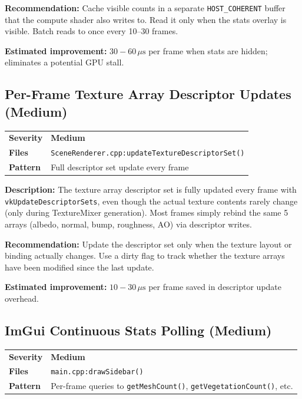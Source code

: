 \documentclass[a4paper,10pt]{article}
\newcommand{\us}{\ensuremath{\,\mu\text{s}}}
\newcommand{\severity}[1]{%
  \ifstrequal{#1}{Critical}{\textcolor{critical}{\textbf{#1}}}{%
  \ifstrequal{#1}{High}{\textcolor{high}{\textbf{#1}}}{%
  \ifstrequal{#1}{Medium}{\textcolor{medium}{\textbf{#1}}}{%
  \ifstrequal{#1}{Low}{\textcolor{low}{\textbf{#1}}}{#1}}}}}
\begin{document}
\noindent\textbf{Recommendation:} Cache visible counts in a separate
\texttt{HOST\_COHERENT} buffer that the compute shader also writes to. Read
it only when the stats overlay is visible. Batch reads to once every 10--30
frames.

\noindent\textbf{Estimated improvement:} $30{-}60\us$ per frame when stats are
hidden; eliminates a potential GPU stall.

\subsection{Per-Frame Texture Array Descriptor Updates (Medium)}

\begin{tabular}{ll}
\textbf{Severity} & \severity{Medium} \\
\textbf{Files}     & \texttt{SceneRenderer.cpp:updateTextureDescriptorSet()} \\
\textbf{Pattern}   & Full descriptor set update every frame \\
\end{tabular}

\vspace{0.5em}
\noindent
\textbf{Description:} The texture array descriptor set is fully updated every
frame with \texttt{vkUpdateDescriptorSets}, even though the actual texture
contents rarely change (only during TextureMixer generation). Most frames
simply rebind the same 5 arrays (albedo, normal, bump, roughness, AO) via
descriptor writes.

\noindent\textbf{Recommendation:} Update the descriptor set only when the
texture layout or binding actually changes. Use a dirty flag to track whether
the texture arrays have been modified since the last update.

\noindent\textbf{Estimated improvement:} $10{-}30\us$ per frame saved in
descriptor update overhead.

\subsection{ImGui Continuous Stats Polling (Medium)}

\begin{tabular}{ll}
\textbf{Severity} & \severity{Medium} \\
\textbf{Files}     & \texttt{main.cpp:drawSidebar()} \\
\textbf{Pattern}   & Per-frame queries to \texttt{getMeshCount()},
                      \texttt{getVegetationCount()}, etc. \\
\end{tabular}
\end{document}
